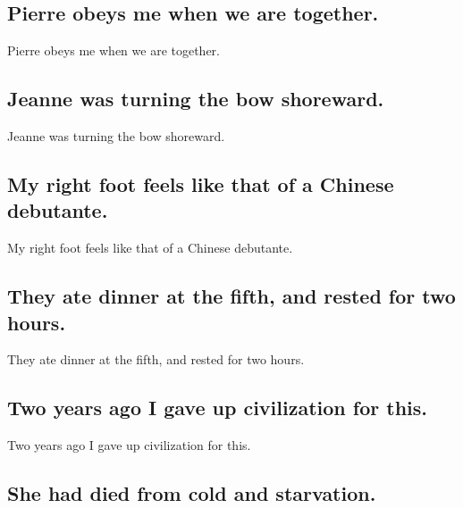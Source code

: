 \documentclass[]{article}
\begin{document}
\hypertarget{pierre-obeys-me-when-we-are-together.}{%
\subsection{Pierre obeys me when we are
together.}\label{pierre-obeys-me-when-we-are-together.}}

Pierre obeys me when we are together.

\hypertarget{jeanne-was-turning-the-bow-shoreward.}{%
\subsection{Jeanne was turning the bow
shoreward.}\label{jeanne-was-turning-the-bow-shoreward.}}

Jeanne was turning the bow shoreward.

\hypertarget{my-right-foot-feels-like-that-of-a-chinese-debutante.}{%
\subsection{My right foot feels like that of a Chinese
debutante.}\label{my-right-foot-feels-like-that-of-a-chinese-debutante.}}

My right foot feels like that of a Chinese debutante.

\hypertarget{they-ate-dinner-at-the-fifth-and-rested-for-two-hours.}{%
\subsection{They ate dinner at the fifth, and rested for two
hours.}\label{they-ate-dinner-at-the-fifth-and-rested-for-two-hours.}}

They ate dinner at the fifth, and rested for two hours.

\hypertarget{two-years-ago-i-gave-up-civilization-for-this.}{%
\subsection{Two years ago I gave up civilization for
this.}\label{two-years-ago-i-gave-up-civilization-for-this.}}

Two years ago I gave up civilization for this.

\hypertarget{she-had-died-from-cold-and-starvation.}{%
\subsection{She had died from cold and
starvation.}\label{she-had-died-from-cold-and-starvation.}}
\end{document}
